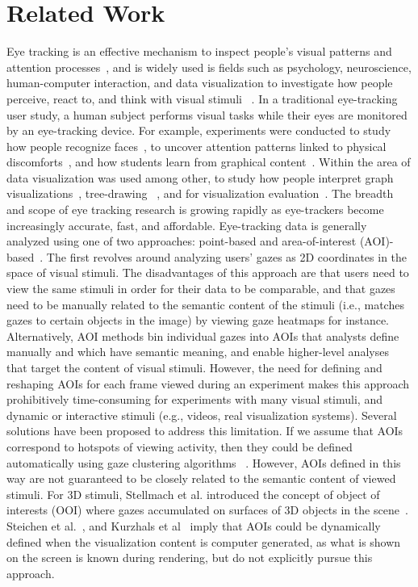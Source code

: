 \section{Related Work}
Eye tracking is an effective mechanism to inspect people's visual patterns and attention processes~\cite{jacob1991use}, and is widely used is fields such as psychology, neuroscience, human-computer interaction, and data visualization to investigate how people perceive, react to, and think with visual stimuli ~\cite{duchowski2002breadth}. In a traditional eye-tracking user study, a human subject performs visual tasks while their eyes are monitored by an eye-tracking device. For example, experiments were conducted to study how people recognize faces~\cite{guo2014perceiving},  to uncover attention patterns linked to physical discomforts~\cite{vervoort2013attentional}, and how students learn from graphical content~\cite{mayer2010unique}. Within the area of data visualization was used among other, to study how people interpret graph visualizations~\cite{pohl2009comparing, huang2008beyond, huang2005people}, tree-drawing ~\cite{burch2011evaluation, burch2013visual}, and for visualization evaluation~\cite{kim2012does}.  The breadth and scope of eye tracking research is growing rapidly as eye-trackers become increasingly accurate, fast, and affordable.  
Eye-tracking data is generally analyzed using one of two approaches: point-based and area-of-interest (AOI)-based~\cite{blascheck2014state}. The first revolves around analyzing users’ gazes as 2D coordinates in the space of visual stimuli. The disadvantages of this approach are that users need to view the same stimuli in order for their data to be comparable, and that gazes need to be manually related to the semantic content of the stimuli  (i.e., matches gazes to certain objects in the image) by viewing gaze heatmaps for instance.  
Alternatively, AOI methods bin individual gazes into AOIs that analysts define manually and which have semantic meaning, and enable higher-level analyses that target the content of visual stimuli. However, the need for defining and reshaping AOIs for each frame viewed during an experiment makes this approach prohibitively time-consuming for experiments with many visual stimuli, and dynamic or interactive stimuli (e.g., videos, real visualization systems).  Several solutions have been proposed to address this limitation. If we assume that AOIs correspond to hotspots of viewing activity, then they could be defined automatically using gaze clustering algorithms   ~\cite{privitera2000algorithms, santella2004robust, drusch2014analysing}.  However, AOIs defined in this way are not guaranteed to be closely related to the semantic content of viewed stimuli.  For 3D stimuli, Stellmach et al. introduced the concept of object of interests (OOI) where gazes accumulated on surfaces of 3D objects in the scene~\cite{stellmach20103d}. Steichen et al.~\cite{steichen2013user}, and Kurzhals et al~\cite{kurzhals2014iseecube} imply that AOIs could be dynamically defined when the visualization content is computer generated, as what is shown on the screen is known during rendering, but do not explicitly pursue this approach. 

